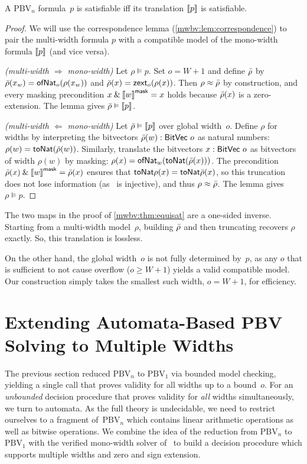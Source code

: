 \begin{theorem}[Equisatisfiability]\label{mwbv:thm:equisat}
A $\text{PBV}_n$ formula~$p$ is satisfiable iff its translation $\left\llbracket p \right\rrbracket$ is satisfiable.
\end{theorem}
\begin{proof}
We will use the correspondence lemma (\cref{mwbv:lem:correspondence})
to pair the multi-width formula $p$ with a compatible model of the mono-width formula $\left\llbracket p \right\rrbracket$ (and vice versa).

\emph{(multi-width $\Rightarrow$ mono-width)} Let $\rho \vDash p$. Set $o = W + 1$ and define $\bar{\rho}$ by
$\bar{\rho}(x_w) = \mathsf{ofNat}_o(\rho(x_w))$ and $\bar{\rho}(x) = \mathsf{zext}_o(\rho(x))$.
Then $\rho \approx \bar{\rho}$ by construction, and every masking precondition
$x \mathbin{\&} \left\llbracket w \right\rrbracket^{\mathsf{mask}} = x$ holds because $\bar{\rho}(x)$ is a zero-extension.
The lemma gives $\bar{\rho} \vDash \left\llbracket p \right\rrbracket$.

\emph{(multi-width $\Leftarrow$ mono-width)} Let $\bar{\rho} \vDash \left\llbracket p \right\rrbracket$ over global width~$o$. Define
$\rho$ for widths by interpreting the bitvectors $\bar{\rho}(w) : \mathsf{BitVec}~{o}$ as natural numbers: $\rho(w) = \mathsf{toNat}(\bar{\rho}(w))$.
Similarly, translate the bitvectors $x : \mathsf{BitVec}~{o}$ as bitvectors of width
$\rho(w)$ by masking: $\rho(x) = \mathsf{ofNat}_w (\mathsf{toNat} (\bar{\rho}(x)))$.
The precondition $\bar{\rho}(x) \mathbin{\&} \left\llbracket w \right\rrbracket^{\mathsf{mask}} = \bar{\rho}(x)$ ensures that $\mathsf{toNat} \rho(x) = \mathsf{toNat} \bar{\rho}(x)$, so
this truncation does not lose information (as \toNat~is injective), and thus $\rho \approx \bar{\rho}$. The lemma gives $\rho \vDash p$.
\end{proof}

\begin{remark}\label{mwbv:rem:width-choice}
The two maps in the proof of \cref{mwbv:thm:equisat} are a one-sided inverse.
Starting from a multi-width model~$\rho$, building $\bar{\rho}$ and then truncating recovers $\rho$ exactly.
So, this translation is lossless.

On the other hand, the global width~$o$ is not fully determined by~$p$, as any $o$
that is sufficient to not cause overflow ($o \ge W + 1$) yields a valid compatible model.
Our construction simply takes the smallest such width, $o = W + 1$, for efficiency.
\end{remark}


\section{Extending Automata-Based PBV Solving to Multiple Widths}
\label{sec:mwbv:automata}
The previous section reduced $\text{PBV}_n$ to $\text{PBV}_1$ via bounded model
checking, yielding a single \qfbv{} call that proves validity for all widths up
to a bound~$o$.
%
For an \emph{unbounded} decision procedure that proves validity for
\emph{all} widths simultaneously, we turn to automata.
%
As the full theory is undecidable, we need to restrict ourselves to a fragment
of~$\text{PBV}_n$ which contains linear arithmetic operations as well as bitwise
operations.
%
We combine the idea of the reduction from $\text{PBV}_n$ to $\text{PBV}_1$ with
the verified mono-width solver of~\citet{bhat2025certified} to build a decision
procedure which supports multiple widths and zero and sign extension.


